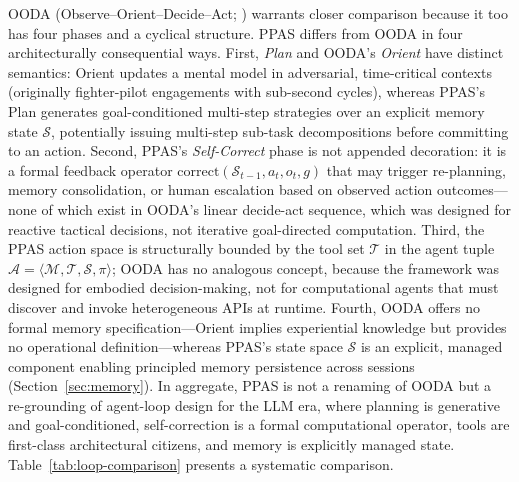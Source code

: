 \documentclass[review]{elsarticle}
\theoremstyle{definition}
\begin{document}
OODA (Observe--Orient--Decide--Act; \citealt{boyd1987ooda}) warrants closer comparison because it too has four phases and a cyclical structure. PPAS differs from OODA in four architecturally consequential ways. First, \emph{Plan} and OODA's \emph{Orient} have distinct semantics: Orient updates a mental model in adversarial, time-critical contexts (originally fighter-pilot engagements with sub-second cycles), whereas PPAS's Plan generates goal-conditioned multi-step strategies over an explicit memory state $\mathcal{S}$, potentially issuing multi-step sub-task decompositions before committing to an action. Second, PPAS's \emph{Self-Correct} phase is not appended decoration: it is a formal feedback operator $\text{correct}(\mathcal{S}_{t-1}, a_t, o_t, g)$ that may trigger re-planning, memory consolidation, or human escalation based on observed action outcomes---none of which exist in OODA's linear decide-act sequence, which was designed for reactive tactical decisions, not iterative goal-directed computation. Third, the PPAS action space is structurally bounded by the tool set $\mathcal{T}$ in the agent tuple $\mathcal{A} = \langle \mathcal{M}, \mathcal{T}, \mathcal{S}, \pi \rangle$; OODA has no analogous concept, because the framework was designed for embodied decision-making, not for computational agents that must discover and invoke heterogeneous APIs at runtime. Fourth, OODA offers no formal memory specification---Orient implies experiential knowledge but provides no operational definition---whereas PPAS's state space $\mathcal{S}$ is an explicit, managed component enabling principled memory persistence across sessions (Section~\ref{sec:memory}). In aggregate, PPAS is not a renaming of OODA but a re-grounding of agent-loop design for the LLM era, where planning is generative and goal-conditioned, self-correction is a formal computational operator, tools are first-class architectural citizens, and memory is explicitly managed state. Table~\ref{tab:loop-comparison} presents a systematic comparison.
\end{document}
